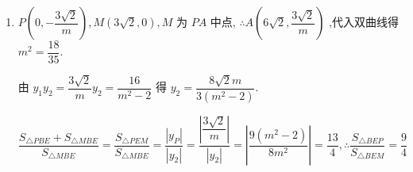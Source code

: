 \begin{enumerate}
\begin{jieda}
\begin{enumerate}
            根据韦达定理有$\left\{\begin{array}{l}
                {y}_{1} + {y}_{2} =  - \dfrac{2mt}{{m}^{2} - 2} \\
                {y}_{1}{y}_{2} = \dfrac{{t}^{2} - 2}{{m}^{2} - 2}
            \end{array}\right.$.
            
            $\vv{AE} \cdot  \vv{BE} = 0$，即$\left( {{m}^{2} + 1}\right) {y}_{1}{y}_{2} + m\left( {t - \sqrt{2}}\right) \left( {{y}_{1} + {y}_{2}}\right)  + {\left( t - \sqrt{2}\right) }^{2} = 0$

            代入得$\dfrac{\left( {{m}^{2} + 1}\right) \left( {{t}^{2} - 2}\right) }{{m}^{2} - 2} - \dfrac{m\left( {t - \sqrt{2}}\right)  \cdot  {2mt}}{{m}^{2} - 2} + {\left( t - \sqrt{2}\right) }^{2} = 0$，即$\left( {t - \sqrt{2}}\right) \left( {3\sqrt{2} - t}\right)  = 0$
            
            当 $t = \sqrt{2}$ 时,直线 ${AB} : x = {my} + \sqrt{2}$ 经过点 $E$ ,不符条件,舍去.
            
            故直线 ${AB} : x = {my} + 3\sqrt{2}$ 必过定点 $M\left( {3\sqrt{2},0}\right)$ .
            
            \item $P\left( {0, - \dfrac{3\sqrt{2}}{m}}\right) ,M\left( {3\sqrt{2},0}\right) ,M$ 为 ${PA}$ 中点, $\therefore A\left( {6\sqrt{2},\dfrac{3\sqrt{2}}{m}}\right)$ ,代入双曲线得 ${m}^{2} = \dfrac{18}{35}$.
            
            由 ${y}_{1}{y}_{2} = \dfrac{3\sqrt{2}}{m}{y}_{2} = \dfrac{16}{{m}^{2} - 2}$ 得 ${y}_{2} = \dfrac{8\sqrt{2}m}{3\left( {{m}^{2} - 2}\right) }$.

            $\dfrac{{S}_{\bigtriangleup {PBE}} + {S}_{\bigtriangleup {MBE}}}{{S}_{\bigtriangleup {MBE}}} = \dfrac{{S}_{\bigtriangleup {PEM}}}{{S}_{\bigtriangleup {MBE}}} = \dfrac{\left| {y}_{P}\right| }{\left| {y}_{2}\right| } = \dfrac{\left| \dfrac{3\sqrt{2}}{m}\right| }{\left| {y}_{2}\right| } = \left| \dfrac{9\left( {{m}^{2} - 2}\right) }{8{m}^{2}}\right|  = \dfrac{13}{4},\therefore \dfrac{{S}_{\bigtriangleup {BEP}}}{{S}_{\bigtriangleup {BEM}}} = \dfrac{9}{4}$
        \end{enumerate}
    \end{jieda}


\end{enumerate}
